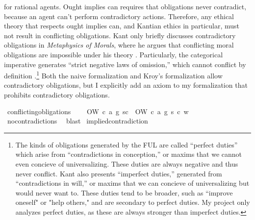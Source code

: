 \begin{isabellebody}
\begin{isamarkuptext}
for rational agents. Ought implies can requires that obligations never contradict, because an agent 
can't perform contradictory actions. Therefore, any ethical theory that respects ought implies can, 
and Kantian ethics in particular, must not result in conflicting obligations. 
Kant only briefly discusses contradictory obligations in \emph{Metaphysics of Morals}, where he argues that 
conflicting moral obligations are impossible under his theory \citep[V224]{metaphysicsintro}. Particularly, the categorical imperative generates 
``strict negative laws of omission,'' which cannot conflict by definition \citep[45]{timmerman}.\footnote{The 
kinds of obligations generated by the FUL are called ``perfect duties'' which arise from ``contradictions 
in conception,'' or maxims that we cannot even concieve of universalizing. These duties are always negative 
and thus never conflict. Kant also presents ``imperfect duties,'' generated from ``contradictions in will,''
or maxims that we can concieve of universalizing but would never want to. These duties tend to be broader, 
such as ``improve oneself" or "help others," and are secondary to perfect duties. My project only analyzes 
perfect duties, as these are always stronger than imperfect duties.} Both the naive formalization and 
Kroy's formalization allow contradictory obligations, but I explicitly add an axiom to my formalization
that prohibits contradictory obligations.%
\end{isamarkuptext}\isamarkuptrue%
\isamarkupfalse%
\ conflicting{\isacharunderscore}obligations{\isacharcolon}\isanewline
\ \ \ {\isachardoublequoteopen}{\isasymnot}\ {\isacharparenleft}O{\isacharbraceleft}W\ {\isacharparenleft}c{\isacharcomma}\ a{\isacharcomma}\ g{\isacharparenright}\ s{\isacharbar}c{\isacharbraceright}\ \isactrlbold {\isasymand}\ O{\isacharbraceleft}\isactrlbold {\isasymnot}{\isacharparenleft}W\ {\isacharparenleft}c{\isacharcomma}\ a{\isacharcomma}\ g{\isacharparenright}\ s{\isacharparenright}{\isacharbar}\ c{\isacharbraceright}{\isacharparenright}\ w{\isachardoublequoteclose}\isanewline
%
\isadelimproof
\ \ %
\endisadelimproof
%
\isatagproof
{}\isamarkupfalse%
\ no{\isacharunderscore}contradictions\ \isamarkupfalse%
\ blast\isanewline
%
%
\endisatagproof
{\isafoldproof}%
%
\isadelimproof
\isanewline
%
\endisadelimproof
\isanewline
{}\isamarkupfalse%
\ implied{\isacharunderscore}contradiction{\isacharcolon}\isanewline

\end{isabellebody}
